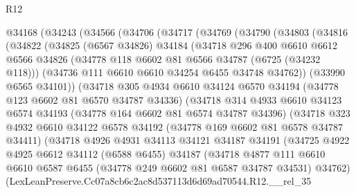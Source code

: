 \begin{lexlean}{R12}
\begin{coremodule}
  @34168
    (@34243
      (@34566
        (@34706
          (@34717
            (@34769
              (@34790
                (@34803
                  (@34816
                    (@34822
                      (@34825
                        (@6567 @34826)
                        @34184
                        (@34718
                          @296
                          @400
                          @6610
                          @6612
                          @6566
                          @34826
                          (@34778 @118 @6602 @81 @6566 @34787 (@6725 (@34232 @118)))
                          (@34736 @111 @6610 @6610 @34254 @6455 @34748 @34762))
                        (@33990 @6565 @34101))
                      (@34718
                        @305
                        @4934
                        @6610
                        @34124
                        @6570
                        @34194
                        (@34778 @123 @6602 @81 @6570 @34787 @34336)
                        (@34718
                          @314
                          @4933
                          @6610
                          @34123
                          @6574
                          @34193
                          (@34778 @164 @6602 @81 @6574 @34787 @34396)
                          (@34718
                            @323
                            @4932
                            @6610
                            @34122
                            @6578
                            @34192
                            (@34778 @169 @6602 @81 @6578 @34787 @34411)
                            (@34718
                              @4926
                              @4931
                              @34113
                              @34121
                              @34187
                              @34191
                              (@34725
                                @4922
                                @4925
                                @6612
                                @34112
                                (@6588 @6455)
                                @34187
                                (@34718
                                  @4877
                                  @111
                                  @6610
                                  @6610
                                  @6587
                                  @6455
                                  (@34778 @249 @6602 @81 @6587 @34787 @34531)
                                  @34762)
                                (LexLeanPreserve.Cc07a8cb6c2ac8d537113d6d69ad70544.R12.__rel_35

\end{coremodule}
\end{lexlean}
